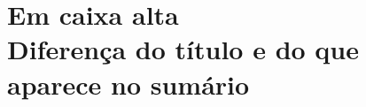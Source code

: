 ﻿\chapter[EM CAIXA ALTA]{Em caixa alta\\ Diferença do título e do que aparece no sumário}
\label{CLN}








